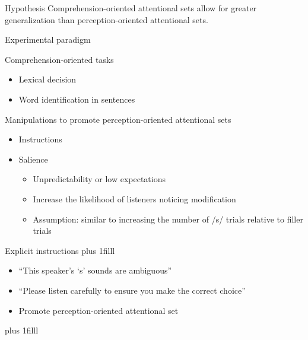 \documentclass{beamer}
\newcommand{\btVFill}{\vskip0pt plus 1filll}
\begin{document}
\begin{frame}{Hypothesis}
\vfill
Comprehension-oriented attentional sets allow for greater generalization than perception-oriented attentional sets.
\vfill
\end{frame}

\begin{frame}{Experimental paradigm}

Comprehension-oriented tasks
\begin{itemize}
\item Lexical decision
\item Word identification in sentences
\end{itemize}

Manipulations to promote perception-oriented attentional sets
\begin{itemize}
\item Instructions
\item Salience
\begin{itemize}
\item Unpredictability or low expectations
\item Increase the likelihood of listeners noticing modification
\item Assumption: similar to increasing the number of /s/ trials relative to filler trials

\end{itemize}

\end{itemize}

\end{frame}

\begin{frame}{Explicit instructions}
\btVFill
\begin{itemize}
\item ``This speaker's `s' sounds are ambiguous''
\item ``Please listen carefully to ensure you make the correct choice''
\item Promote perception-oriented attentional set
\end{itemize}

\btVFill
\begin{flushright}
\scriptsize
\citet{Pitt2012}
\end{flushright}
\end{frame}
\end{document}
